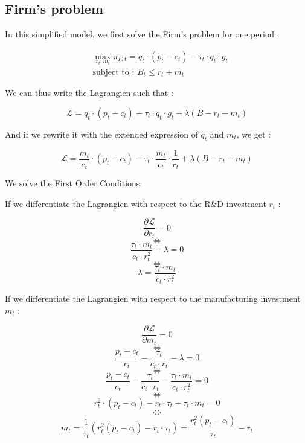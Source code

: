 \documentclass{article}
\begin{document}
\subsection{Firm's problem}

In this simplified model, we first solve the Firm's problem for one period : 

\begin{equation*}
    \begin{split}
    & \max_{r_{t},m_{t}}{\pi_{F,t}=q_{t}\cdot\left(p_{t}-c_{t}\right)-\tau_{t}\cdot q_{t}\cdot g_{t}} \\ 
    & \text{subject to : } B_{t} \leq r_{t} + m_{t}
    \end{split}
\end{equation*}

We can thus write the Lagrangien such that : 

\begin{equation*}
    \mathcal{L} = q_{t}\cdot\left(p_{t}-c_{t}\right)-\tau_{t}\cdot q_{t}\cdot g_{t}+\lambda\left(B-r_{t}-m_{t}\right)
\end{equation*}

And if we rewrite it with the extended expression of $q_{t}$ and $m_{t}$, we get : 

\begin{equation*}
    \mathcal{L} = \frac{m_{t}}{c_{t}}\cdot\left(p_{t}-c_{t}\right)-\tau_{t}\cdot \frac{m_{t}}{c_{t}}\cdot \frac{1}{r_{t}}+\lambda\left(B-r_{t}-m_{t}\right)
\end{equation*}

We solve the First Order Conditions.

If we differentiate the Lagrangien with respect to the R\&D investment $r_{t}$ :

$$\frac{\partial \mathcal{L}}{\partial r_{t}}=0$$
$$\iff$$
$$\frac{\tau_{t}\cdot m_{t}}{c_{t}\cdot r^{2}_{t}}-\lambda=0$$
$$\iff$$
$$\lambda=\frac{\tau_{t}\cdot m_{t}}{c_{t}\cdot r^{2}_{t}}$$

If we differentiate the Lagrangien with respect to the manufacturing investment $m_{t}$ :

$$\frac{\partial \mathcal{L}}{\partial m_{t}}=0$$
$$\iff$$
$$\frac{p_{t}-c_{t}}{c_{t}}-\frac{\tau_{t}}{c_{t}\cdot r_{t}}-\lambda=0$$
$$\iff$$
$$\frac{p_{t}-c_{t}}{c_{t}}-\frac{\tau_{t}}{c_{t}\cdot r_{t}}-\frac{\tau_{t}\cdot m_{t}}{c_{t}\cdot r^{2}_{t}}=0$$
$$\iff$$
$$r^{2}_{t}\cdot(p_{t}-c_{t})-r_{t}\cdot \tau_{t}-\tau_{t}\cdot m_{t}=0$$
$$\iff$$
\begin{equation}
    m_{t}=\frac{1}{\tau_{t}}\left(r_{t}^{2}(p_{t}-c_{t})-r_{t}\cdot \tau_{t}\right)=\frac{r_{t}^{2}\left(p_{t}-c_{t}\right)}{\tau_{t}}-r_{t}
\end{equation}
\end{document}
